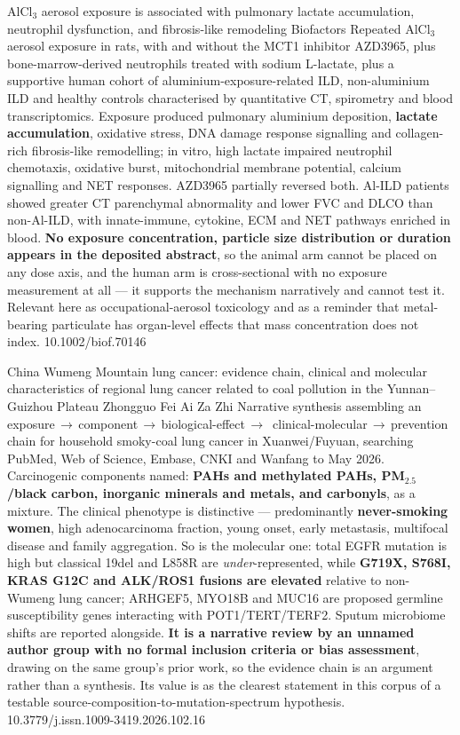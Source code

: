 \documentclass[10pt]{article}
\begin{document}
{AlCl$_3$ aerosol exposure is associated with pulmonary lactate accumulation, neutrophil dysfunction, and fibrosis-like remodeling}
{Biofactors}
{Repeated AlCl$_3$ aerosol exposure in rats, with and without the MCT1 inhibitor AZD3965,
plus bone-marrow-derived neutrophils treated with sodium L-lactate, plus a supportive
human cohort of aluminium-exposure-related ILD, non-aluminium ILD and healthy controls
characterised by quantitative CT, spirometry and blood transcriptomics. Exposure produced
pulmonary aluminium deposition, \textbf{lactate accumulation}, oxidative stress, DNA
damage response signalling and collagen-rich fibrosis-like remodelling; in vitro,
high lactate impaired neutrophil chemotaxis, oxidative burst, mitochondrial membrane
potential, calcium signalling and NET responses. AZD3965 partially reversed both.
Al-ILD patients showed greater CT parenchymal abnormality and lower FVC and DLCO than
non-Al-ILD, with innate-immune, cytokine, ECM and NET pathways enriched in blood.
\textbf{No exposure concentration, particle size distribution or duration appears in the
deposited abstract}, so the animal arm cannot be placed on any dose axis, and the human
arm is cross-sectional with no exposure measurement at all --- it supports the mechanism
narratively and cannot test it. Relevant here as occupational-aerosol toxicology and as
a reminder that metal-bearing particulate has organ-level effects that mass concentration
does not index.}
{10.1002/biof.70146}


{China Wumeng Mountain lung cancer: evidence chain, clinical and molecular characteristics of regional lung cancer related to coal pollution in the Yunnan--Guizhou Plateau}
{Zhongguo Fei Ai Za Zhi}
{Narrative synthesis assembling an
exposure\,$\rightarrow$\,component\,$\rightarrow$\,biological-effect\,$\rightarrow$\,%
clinical-molecular\,$\rightarrow$\,prevention chain for household smoky-coal lung cancer
in Xuanwei/Fuyuan, searching PubMed, Web of Science, Embase, CNKI and Wanfang to May 2026.
Carcinogenic components named: \textbf{PAHs and methylated PAHs, PM$_{2.5}$/black carbon,
inorganic minerals and metals, and carbonyls}, as a mixture. The clinical phenotype is
distinctive --- predominantly \textbf{never-smoking women}, high adenocarcinoma fraction,
young onset, early metastasis, multifocal disease and family aggregation. So is the
molecular one: total EGFR mutation is high but classical 19del and L858R are
\emph{under}-represented, while \textbf{G719X, S768I, KRAS G12C and ALK/ROS1 fusions are
elevated} relative to non-Wumeng lung cancer; ARHGEF5, MYO18B and MUC16 are proposed
germline susceptibility genes interacting with POT1/TERT/TERF2. Sputum microbiome shifts
are reported alongside. \textbf{It is a narrative review by an unnamed author group with
no formal inclusion criteria or bias assessment}, drawing on the same group's prior work,
so the evidence chain is an argument rather than a synthesis. Its value is as the clearest
statement in this corpus of a testable source-composition-to-mutation-spectrum hypothesis.}
{10.3779/j.issn.1009-3419.2026.102.16}
\end{document}
